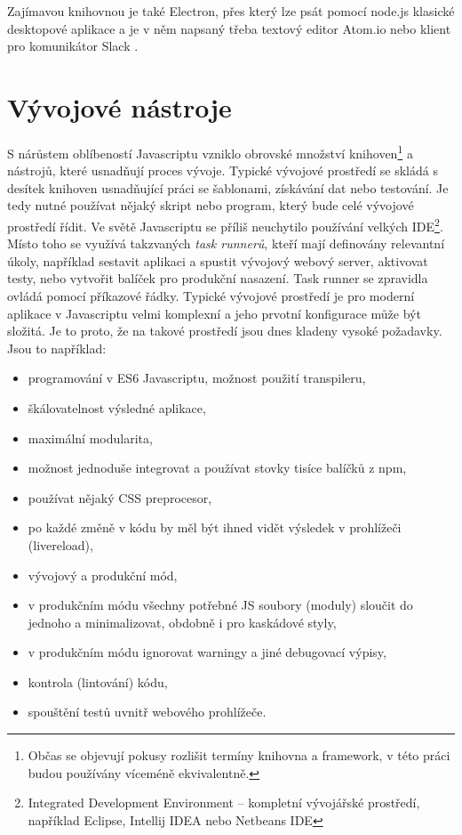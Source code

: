 Zajímavou knihovnou je také Electron, přes který lze psát pomocí node.js klasické desktopové aplikace a je v něm napsaný třeba textový editor Atom.io nebo klient pro komunikátor Slack \cite{elektron}. 

\section{Vývojové nástroje}
S nárůstem oblíbeností Javascriptu vzniklo obrovské množství knihoven\footnote{Občas se objevují pokusy rozlišit termíny knihovna a framework, v této práci budou používány víceméně ekvivalentně.} a nástrojů, které usnadňují proces vývoje. Typické vývojové prostředí se skládá s desítek knihoven usnadňující práci se šablonami, získávání dat nebo testování. Je tedy nutné používat nějaký skript nebo program, který bude celé vývojové prostředí řídit. Ve světě Javascriptu se příliš neuchytilo používání velkých IDE\footnote{Integrated Development Environment – kompletní vývojářské prostředí, například Eclipse, Intellij IDEA nebo Netbeans IDE}. Místo toho se využívá takzvaných \textit{task runnerů}, kteří mají definovány relevantní úkoly, například sestavit aplikaci a spustit vývojový webový server, aktivovat testy, nebo vytvořit balíček pro produkční nasazení. Task runner se zpravidla ovládá pomocí příkazové řádky. Typické vývojové prostředí je pro moderní aplikace v Javascriptu velmi komplexní a jeho prvotní konfigurace může být složitá. Je to proto, že na takové prostředí jsou dnes kladeny vysoké požadavky. Jsou to například: \cite{flanagan_javascript} \cite{task_runners} 

\vspace{0.5cm}
\begin{itemize}
\item programování v ES6 Javascriptu, možnost použití transpileru,
\item škálovatelnost výsledné aplikace,
\item maximální modularita,
\item možnost jednoduše integrovat a používat stovky tisíce balíčků z npm,
\item používat nějaký CSS preprocesor, 
\item po každé změně v kódu by měl být ihned vidět výsledek v prohlížeči (livereload),
\item vývojový a produkční mód,
\item v produkčním módu všechny potřebné JS soubory (moduly) sloučit do jednoho a minimalizovat, obdobně i pro kaskádové styly,
\item v produkčním módu ignorovat warningy a jiné debugovací výpisy,
\item kontrola (lintování) kódu,
\item spouštění testů uvnitř webového prohlížeče.
\end{itemize}

